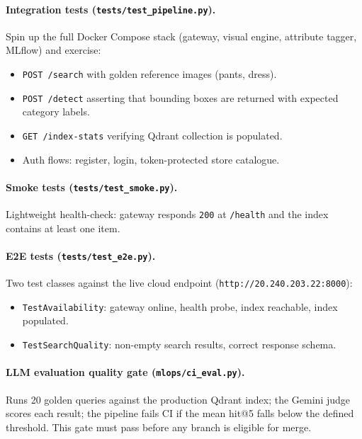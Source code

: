 \documentclass[12pt]{article}
\begin{document}
\paragraph{Integration tests (\texttt{tests/test\_pipeline.py}).}
Spin up the full Docker Compose stack (gateway, visual engine, attribute tagger, MLflow) and exercise:
\begin{itemize}[leftmargin=*, itemsep=1pt]
  \item \texttt{POST /search} with golden reference images (pants, dress).
  \item \texttt{POST /detect} asserting that bounding boxes are returned with expected category labels.
  \item \texttt{GET /index-stats} verifying Qdrant collection is populated.
  \item Auth flows: register, login, token-protected store catalogue.
\end{itemize}

\paragraph{Smoke tests (\texttt{tests/test\_smoke.py}).}
Lightweight health-check: gateway responds \texttt{200} at \texttt{/health} and the index contains at least one item.

\paragraph{E2E tests (\texttt{tests/test\_e2e.py}).}
Two test classes against the live cloud endpoint (\texttt{http://20.240.203.22:8000}):
\begin{itemize}[leftmargin=*, itemsep=1pt]
  \item \texttt{TestAvailability}: gateway online, health probe, index reachable, index populated.
  \item \texttt{TestSearchQuality}: non-empty search results, correct response schema.
\end{itemize}

\paragraph{LLM evaluation quality gate (\texttt{mlops/ci\_eval.py}).}
Runs 20 golden queries against the production Qdrant index; the Gemini judge scores each result; the pipeline fails CI if the mean hit@5 falls below the defined threshold. This gate must pass before any branch is eligible for merge.
\end{document}
